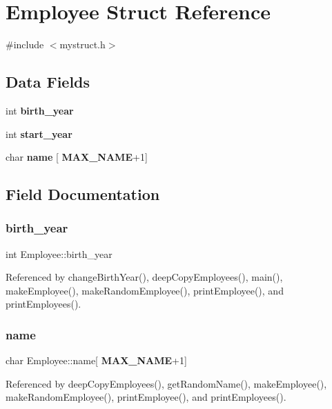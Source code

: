 \section{Employee Struct Reference}
\label{structEmployee}


{\ttfamily \#include $<$mystruct.\+h$>$}

\subsection*{Data Fields}
\begin{DoxyCompactItemize}
\item 
int \textbf{ birth\+\_\+year}
\item 
int \textbf{ start\+\_\+year}
\item 
char \textbf{ name} [\textbf{ M\+A\+X\+\_\+\+N\+A\+ME}+1]
\end{DoxyCompactItemize}


\subsection{Field Documentation}
\mbox{\label{structEmployee_a760204f198562c478aa489b14c7d1d29}} 
\subsubsection{birth\+\_\+year}
{\footnotesize\ttfamily int Employee\+::birth\+\_\+year}



Referenced by change\+Birth\+Year(), deep\+Copy\+Employees(), main(), make\+Employee(), make\+Random\+Employee(), print\+Employee(), and print\+Employees().

\mbox{\label{structEmployee_acd7c4b846e2076017e5fe21ed23ac8dd}} 
\subsubsection{name}
{\footnotesize\ttfamily char Employee\+::name[\textbf{ M\+A\+X\+\_\+\+N\+A\+ME}+1]}



Referenced by deep\+Copy\+Employees(), get\+Random\+Name(), make\+Employee(), make\+Random\+Employee(), print\+Employee(), and print\+Employees().

\mbox{\label{structEmployee_a64042e9bd1a3451ba0349b59f21325a6}} 
